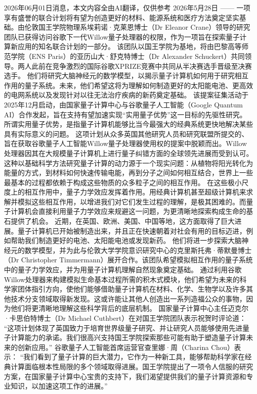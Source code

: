\documentclass[12pt,a4paper]{ctexart}
\begin{document}
2026年06月01日消息，本文内容全由AI翻译，仅供参考
2026年5月28日 —— 一项享有盛誉的联合计划将有望为创造更好的材料、能源系统和医疗方法奠定坚实基础。由伦敦国王学院物理系埃莉诺·克莱恩博士（Dr Eleanor Crane）领导的研究团队已获得访问谷歌下一代Willow量子处理器的权限，作为一项旨在探索量子计算新应用的知名联合计划的一部分。
该团队以国王学院为基地，将由巴黎高等师范学院（ENS Paris）的亚历山大·舒克特博士（Dr Alexander Schuckert）共同领导。两人此前在竞争激烈的国际谷歌XPRIZE竞赛中共同从半决赛选手晋级至决赛选手。
他们将研究大脑神经元的数学模型，以揭示量子计算机如何用于研究相互作用的量子系统。未来，他们希望这将为理解如何制造更好的太阳能电池、更高效的电网系统以及发现针对以往无法治疗疾病的新药奠定基础。
该提案征集活动于2025年12月启动，由国家量子计算中心与谷歌量子人工智能（Google Quantum AI）合作发起，旨在支持有望加速实现“实用量子优势”这一目标的先驱性研究。所谓实用量子优势，是指量子计算机能够比当今最强大的经典系统更快地解决某些具有实际意义的问题。
这项计划从众多英国其他研究人员和研究联盟所提交的、旨在获取谷歌量子人工智能Willow量子处理器使用权的提案中脱颖而出。Willow处理器因其在大规模量子计算机上进行量子纠错方面的全球领先进展而受到认可。
这种以基础科学方法研究量子计算的动力源于一个现实问题：从植物将阳光转化为能量的方式，到材料如何快速传输电能，再到分子之间如何相互结合，世界上一些最基本的过程都依赖于构成这些物质的众多粒子之间的相互作用。
在这些极小尺度上的相互作用中，量子力学效应发挥着作用。用经典计算机甚至超级计算机来求解并模拟这些相互作用，以增进我们对它们发生过程的理解，是极其困难的。而量子计算机会直接利用量子力学效应来规避这一问题，为更清晰地探索构成生命的基石提供了机会。
近期，在英国、欧洲、美国、中国等地，这方面取得了巨大进展。量子计算机已开始被制造出来，并且正在快速朝着对社会有用的目标迈进，例如帮助我们制造更好的电池、太阳能电池或发现新药。
他们将进一步探索大脑神经元的数学模型，并为此与伦敦大学学院意识研究中心的克里斯托弗·蒂默曼博士（Dr Christopher Timmermann）展开合作。该团队希望模拟相互作用的量子系统中的量子力学效应，并为用量子计算机理解自然现象奠定基础。
通过利用谷歌Willow处理器来构建模拟生命基本过程所需的积木式模块，他们希望为未来的科学家团体指引方向，使他们能够借助量子计算机在材料、化学、生物学以及许多其他技术分支领域取得新发现。这或许能让其他人创造出一系列造福公众的事物，因为他们将更清晰地理解这些科学背后的底层机制。
国家量子计算中心主任迈克尔·卡思伯特博士（Dr Michael Cuthbert）在对国王学院团队表示祝贺时评论道：
“这项计划体现了英国致力于培育世界级量子研究、并让研究人员能够使用先进量子计算能力的承诺。我们很高兴支持国王学院探索那些可能有助于塑造量子计算未来的创新应用。”
谷歌量子人工智能首席运营官查里娜·周（Charina Chou）表示：
“我们看到了量子计算的巨大潜力，它作为一种新工具，能够帮助科学家在经典计算面临根本性局限的多个领域取得进展。国王学院提出了一项令人信服的研究方案，在国家量子计算中心宝贵的支持下，我们渴望提供我们的量子计算资源和专业知识，以加速这项工作的进展。”
\end{document}

